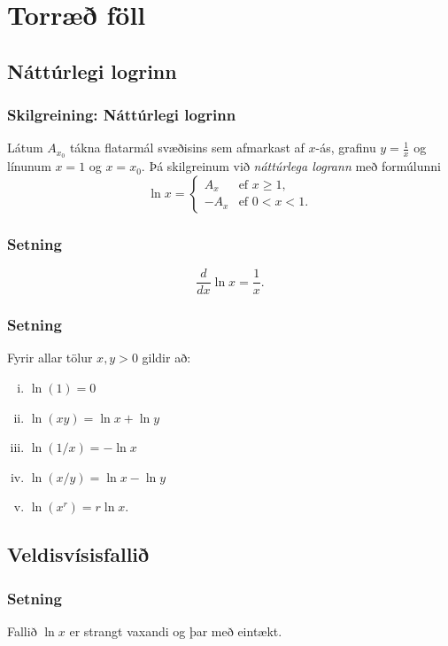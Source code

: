 \documentclass[icelandic,a4paper,12pt]{article}
\date{29. ágúst 2015}
\begin{document}
\setcounter{tocdepth}{2}
\tableofcontents

\section{Torræð föll}
\subsection{Náttúrlegi logrinn}
\subsubsection{Skilgreining: Náttúrlegi logrinn}
Látum $A_{x_0}$ tákna flatarmál svæðisins sem
afmarkast af $x$-ás, grafinu $y=\frac{1}{x}$ og línunum $x=1$ og
$x=x_0$.
\pause
Þá skilgreinum við \emph{náttúrlega logrann} með
formúlunni 
\begin{equation*}
\ln x =\left\{\begin{array}{ll}
A_x & \mbox{ef }x\geq 1,\\
-A_x & \mbox{ef }0<x<1.
\end{array}
\right.
\end{equation*}

\pause
\subsubsection{Setning}  
$$
\frac{d}{dx}\ln x=\frac{1}{x}.
$$

\subsubsection{Setning}
Fyrir allar tölur $x,y>0$ gildir að:\pause
\begin{enumerate}[(i)]
\item $\ln(1) = 0$\pause
\item  $\ln(xy)=\ln x+\ln y$\pause
\item  $\ln(1/x)=-\ln x$\pause
\item  $\ln(x/y)=\ln x-\ln y$\pause
\item $\ln (x^r)=r\ln x$. 
\end{enumerate}
 
\subsection{Veldisvísisfallið}
\subsubsection{Setning}
Fallið $\ln x$ er strangt vaxandi og þar með eintækt.
\end{document}
